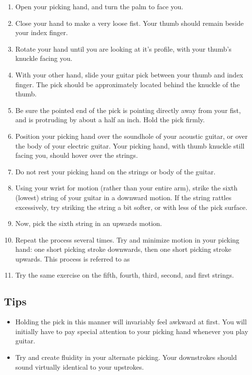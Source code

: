 \begin{enumerate}
\item Open your picking hand, and turn the palm to face you.
\item Close your hand to make a very loose fist. Your thumb should remain
      beside your index finger.
\item Rotate your hand until you are looking at it's profile, with your thumb's
      knuckle facing you.
\item With your other hand, slide your guitar pick between your thumb and index
      finger. The pick should be approximately located behind the knuckle of the
      thumb.
\item Be sure the pointed end of the pick is pointing directly away from your
      fist, and is protruding by about a half an inch. Hold the pick firmly.
\item Position your picking hand over the soundhole of your acoustic guitar, or
      over the body of your electric guitar. Your picking hand, with thumb knuckle
      still facing you, should hover over the strings.
\item Do not rest your picking hand on the strings or body of the guitar.
\item Using your wrist for motion (rather than your entire arm), strike the
      sixth (lowest) string of your guitar in a downward motion. If the string
      rattles excessively, try striking the string a bit softer, or with less of the
      pick surface.
\item Now, pick the sixth string in an upwards motion.
\item Repeat the process several times. Try and minimize motion in your picking
      hand: one short picking stroke downwards, then one short picking stroke
      upwards. This process is referred to as 
\item Try the same exercise on the fifth, fourth, third, second, and first strings.
\end{enumerate}
%
\subsection{Tips}
\begin{itemize}
\item Holding the pick in this manner will invariably feel awkward at first.
      You will initially have to pay special attention to your picking hand whenever
      you play guitar.
\item Try and create fluidity in your alternate picking. Your downstrokes
      should sound virtually identical to your upstrokes.
\end{itemize}

